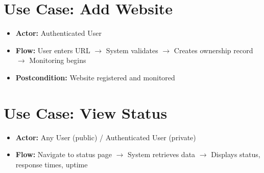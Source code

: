 \section{Use Case: Add Website}

\begin{itemize}
    \item \textbf{Actor:} Authenticated User
    \item \textbf{Flow:} User enters URL $\rightarrow$ System validates $\rightarrow$ Creates ownership record $\rightarrow$ Monitoring begins
    \item \textbf{Postcondition:} Website registered and monitored
\end{itemize}

\section{Use Case: View Status}

\begin{itemize}
    \item \textbf{Actor:} Any User (public) / Authenticated User (private)
    \item \textbf{Flow:} Navigate to status page $\rightarrow$ System retrieves data $\rightarrow$ Displays status, response times, uptime
\end{itemize}


